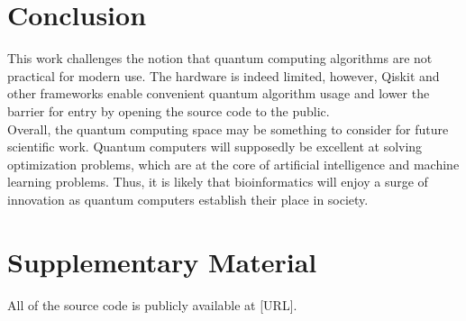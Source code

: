 \documentclass{article}
\begin{document}
\section{Conclusion}
  This work challenges the notion that quantum computing algorithms are not practical for modern use. The hardware is indeed limited, however, Qiskit and other frameworks enable convenient quantum algorithm usage and lower the barrier for entry by opening the source code to the public. \\

  Overall, the quantum computing space may be something to consider for future scientific work. Quantum computers will supposedly be excellent at solving optimization problems, which are at the core of artificial intelligence and machine learning problems. Thus, it is likely that bioinformatics will enjoy a surge of innovation as quantum computers establish their place in society.

\section{Supplementary Material}
All of the source code is publicly available at [URL].

\newpage

\raggedright

\end{document}
